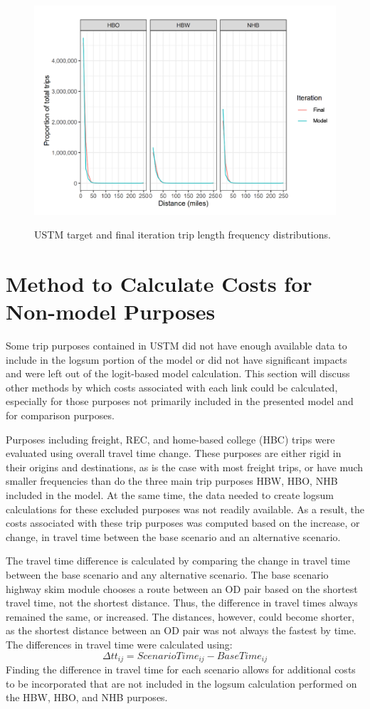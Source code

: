 \begin{figure}
  \centering
{\centering \includegraphics[width=0.75\linewidth]{figures/chapter3/tlfd1.png}
}
\caption{USTM target and final iteration trip length frequency distributions.}\label{fig:ustm_tlfd}
\end{figure}

\section{Method to Calculate Costs for Non-model Purposes}

Some trip purposes contained in USTM did not have enough available data to
include in the logsum portion of the model or did not have
significant impacts and were left out of the logit-based model
calculation. This section will discuss other methods by which costs
associated with each link could be calculated, especially for those
purposes not primarily included in the presented model and for comparison purposes.

Purposes including freight, REC, and home-based college
(HBC) trips were evaluated using overall travel time change. These
purposes are either rigid in their origins and destinations, as is the
case with most freight trips, or have much smaller frequencies than do the
three main trip purposes HBW, HBO, NHB included in the model. At the same time,
the data needed to create logsum calculations for these
excluded purposes was not readily available. As a result, the costs associated with these trip
purposes was computed based on the increase, or change, in travel time between the base
scenario and an alternative scenario.

The travel time difference is calculated by comparing the change in travel
time between the base scenario and any alternative scenario. The base
scenario highway skim module chooses a route between an OD pair based on
the shortest travel time, not the shortest distance. Thus, the difference
in travel times always remained the same, or increased. The distances, however,
could become shorter, as the shortest distance between an OD pair was not
always the fastest by time. The differences in travel time were calculated using:
\begin{equation}
	\Delta tt_{ij} = ScenarioTime_{ij} - BaseTime_{ij}
	\label{eqn:time}
\end{equation}
Finding the difference in travel time for each scenario allows for
additional costs to be incorporated that are not included in the logsum
calculation performed on the HBW, HBO, and NHB purposes.

